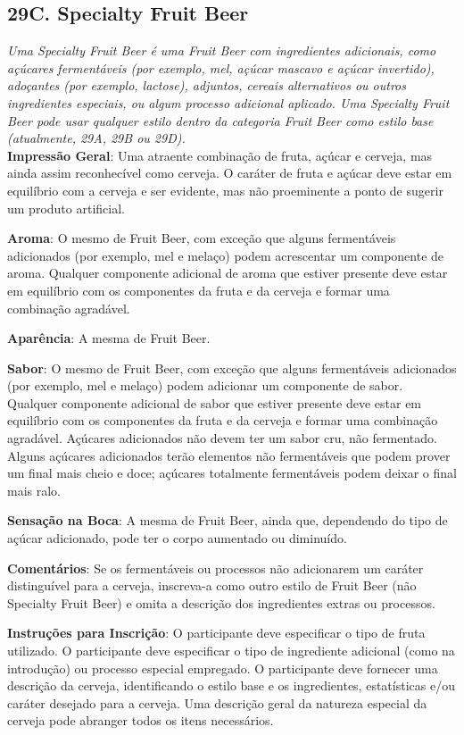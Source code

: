 \subsection*{29C. Specialty Fruit Beer}
\textit{Uma Specialty Fruit Beer é uma Fruit Beer com ingredientes adicionais, como açúcares fermentáveis (por exemplo, mel, açúcar mascavo e açúcar invertido), adoçantes (por exemplo, lactose), adjuntos, cereais alternativos ou outros ingredientes especiais, ou algum processo adicional aplicado. Uma Specialty Fruit Beer pode usar qualquer estilo dentro da categoria Fruit Beer como estilo base (atualmente, 29A, 29B ou 29D).}\\
\textbf{Impressão Geral}: Uma atraente combinação de fruta, açúcar e cerveja, mas ainda assim reconhecível como cerveja. O caráter de fruta e açúcar deve estar em equilíbrio com a cerveja e ser evidente, mas não proeminente a ponto de sugerir um produto artificial.

\textbf{Aroma}: O mesmo de Fruit Beer, com exceção que alguns fermentáveis adicionados (por exemplo, mel e melaço) podem acrescentar um componente de aroma. Qualquer componente adicional de aroma que estiver presente deve estar em equilíbrio com os componentes da fruta e da cerveja e formar uma combinação agradável.

\textbf{Aparência}: A mesma de Fruit Beer.

\textbf{Sabor}: O mesmo de Fruit Beer, com exceção que alguns fermentáveis adicionados (por exemplo, mel e melaço) podem adicionar um componente de sabor. Qualquer componente adicional de sabor que estiver presente deve estar em equilíbrio com os componentes da fruta e da cerveja e formar uma combinação agradável. Açúcares adicionados não devem ter um sabor cru, não fermentado. Alguns açúcares adicionados terão elementos não fermentáveis que podem prover um final mais cheio e doce; açúcares totalmente fermentáveis podem deixar o final mais ralo.

\textbf{Sensação na Boca}: A mesma de Fruit Beer, ainda que, dependendo do tipo de açúcar adicionado, pode ter o corpo aumentado ou diminuído.

\textbf{Comentários}: Se os fermentáveis ou processos não adicionarem um caráter distinguível para a cerveja, inscreva-a como outro estilo de Fruit Beer (não Specialty Fruit Beer) e omita a descrição dos ingredientes extras ou processos.

\textbf{Instruções para Inscrição}: O participante deve especificar o tipo de fruta utilizado. O participante deve especificar o tipo de ingrediente adicional (como na introdução) ou processo especial empregado. O participante deve fornecer uma descrição da cerveja, identificando o estilo base e os ingredientes, estatísticas e/ou caráter desejado para a cerveja. Uma descrição geral da natureza especial da cerveja pode abranger todos os itens necessários.

